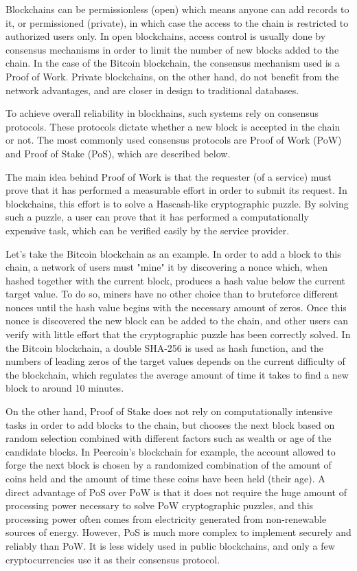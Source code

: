 \documentclass{article}
\begin{document}
\bigskip

Blockchains can be permissionless (open) which means anyone can add records to it, or permissioned (private), in which case the access to the chain is restricted to authorized users only. In open blockchains, access control is usually done by consensus mechanisms in order to limit the number of new blocks added to the chain. In the case of the Bitcoin blockchain, the consensus mechanism used is a Proof of Work.
Private blockchains, on the other hand, do not benefit from the network advantages, and are closer in design to traditional databases.

\bigskip

To achieve overall reliability in blockhains, such systems rely on consensus protocols. These protocols dictate whether a new block is accepted in the chain or not. The most commonly used consensus protocols are Proof of Work (PoW) and Proof of Stake (PoS), which are described below.

\bigskip

The main idea behind Proof of Work is that the requester (of a service) must prove that it has performed a measurable effort in order to submit its request. In blockchains, this effort is to solve a Hascash-like\cite{back2002hashcash} cryptographic puzzle. By solving such a puzzle, a user can prove that it has performed a computationally expensive task, which can be verified easily by the service provider.


Let's take the Bitcoin blockchain as an example. In order to add a block to this chain, a network of users must "mine" it by discovering a nonce which, when hashed together with the current block, produces a hash value below the current target value. To do so, miners have no other choice than to bruteforce different nonces until the hash value begins with the necessary amount of zeros. Once this nonce is discovered the new block can be added to the chain, and other users can verify with little effort that the cryptographic puzzle has been correctly solved. In the Bitcoin blockchain, a double SHA-256 is used as hash function, and the numbers of leading zeros of the target values depends on the current difficulty of the blockchain, which regulates the average amount of time it takes to find a new block to around 10 minutes.

\bigskip

On the other hand, Proof of Stake does not rely on computationally intensive tasks in order to add blocks to the chain, but chooses the next block based on random selection combined with different factors such as wealth or age of the candidate blocks. In Peercoin's blockchain for example, the account allowed to forge the next block is chosen by a randomized combination of the amount of coins held and the amount of time these coins have been held (their age). A direct advantage of PoS over PoW is that it does not require the huge amount of processing power necessary to solve PoW cryptographic puzzles, and this processing power often comes from electricity generated from non-renewable sources of energy. However, PoS is much more complex to implement securely and reliably than PoW. It is less widely used in public blockchains, and only a few cryptocurrencies use it as their consensus protocol.
\end{document}
